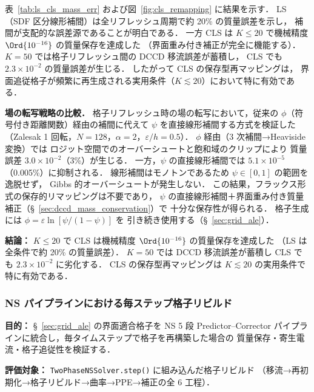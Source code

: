 表~\ref{tab:ls_cls_mass_err} および図~\ref{fig:cls_remapping} に結果を示す．
LS（SDF 区分線形補間）は全リフレッシュ周期で約 20\% の質量誤差を示し，
補間が支配的な誤差源であることが明白である．
一方 CLS は $K \leq 20$ で機械精度 $\Ord{10^{-16}}$ の質量保存を達成した
（界面重み付き補正が完全に機能する）．
$K = 50$ では格子リフレッシュ間の DCCD 移流誤差が蓄積し，
CLS でも $2.3 \times 10^{-2}$ の質量誤差が生じる．
したがって CLS の保存型再マッピングは，
界面追従格子が頻繁に再生成される実用条件（$K \lesssim 20$）において特に有効である．

\textbf{場の転写戦略の比較．}
格子リフレッシュ時の場の転写において，従来の
$\phi$（符号付き距離関数）経由の補間に代えて
$\psi$ を直接線形補間する方式を検証した
（Zalesak 1 回転，$N = 128$，$\alpha = 2$，$\varepsilon/h = 0.5$）．
$\phi$ 経由（3 次補間→Heaviside 変換）では
ロジット空間でのオーバーシュートと飽和域のクリップにより
質量誤差 $3.0 \times 10^{-2}$（3\%）が生じる．
一方，$\psi$ の直接線形補間では $5.1 \times 10^{-5}$（0.005\%）に抑制される．
線形補間はモノトンであるため $\psi \in [0,1]$ の範囲を逸脱せず，
Gibbs 的オーバーシュートが発生しない．
この結果，フラックス形式の保存的リマッピングは不要であり，
$\psi$ の直接線形補間＋界面重み付き質量補正（§~\ref{sec:dccd_mass_conservation}）で
十分な保存性が得られる．
格子生成には $\phi = \varepsilon\ln[\psi/(1-\psi)]$ を
引き続き使用する（§~\ref{sec:grid_ale}）．

\noindent\textbf{結論：}
$K \leq 20$ で CLS は機械精度 $\Ord{10^{-16}}$ の質量保存を達成した
（LS は全条件で約 20\% の質量誤差）．
$K = 50$ では DCCD 移流誤差が蓄積し CLS でも $2.3 \times 10^{-2}$ に劣化する．
CLS の保存型再マッピングは $K \lesssim 20$ の実用条件で特に有効である．


\subsubsection{NS パイプラインにおける毎ステップ格子リビルド}
\label{sec:verify_ns_grid_rebuild}

\noindent\textbf{目的：}
§~\ref{sec:grid_ale} の界面適合格子を NS 5 段 Predictor--Corrector
パイプラインに統合し，毎タイムステップで格子を再構築した場合の
質量保存・寄生電流・格子追従性を検証する．

\noindent\textbf{評価対象：}
\texttt{TwoPhaseNSSolver.step()} に組み込んだ格子リビルド
（移流→再初期化→格子リビルド→曲率→PPE→補正の全 6 工程）．

